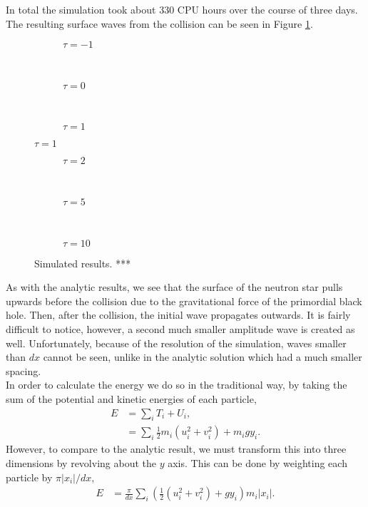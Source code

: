 In total the simulation took about 330 CPU hours over the course of three days. The resulting surface waves from the collision can be seen in Figure \ref{fig:simresults}.
\begin{figure}[p]
\centering
\begin{subfigure}{\textwidth}

\caption{$\tau = -1$}
\end{subfigure} \\
\begin{subfigure}{\textwidth}

\caption{$\tau = 0$}
\end{subfigure} \\
\begin{subfigure}{\textwidth}

\caption{$\tau = 1$}
\end{subfigure}
\end{figure}
\begin{figure}[p] \ContinuedFloat
\centering
\begin{subfigure}{\textwidth}

\caption{$\tau = 2$}
\end{subfigure} \\
\begin{subfigure}{\textwidth}

\caption{$\tau = 5$}
\end{subfigure} \\
\begin{subfigure}{\textwidth}

\caption{$\tau = 10$}
\end{subfigure}
\caption{Simulated results.  ***}
\label{fig:simresults}
\end{figure}
As with the analytic results, we see that the surface of the neutron star pulls upwards before the collision due to the gravitational force of the primordial black hole. Then, after the collision, the initial wave propagates outwards. It is fairly difficult to notice, however, a second much smaller amplitude wave is created as well. Unfortunately, because of the resolution of the simulation, waves smaller than $dx$ cannot be seen, unlike in the analytic solution which had a much smaller spacing. \\

In order to calculate the energy we do so in the traditional way, by taking the sum of the potential and kinetic energies of each particle,
\begin{align*}
E &= \sum_i T_i + U_i, \\
&= \sum_i \frac{1}{2} m_i \left( u_i^2 + v_i^2 \right) + m_i g y_i.
\end{align*}
However, to compare to the analytic result, we must transform this into three dimensions by revolving about the $y$ axis. This can be done by weighting each particle by $\pi |x_i| / dx$,
\begin{align*}
E &= \frac{\pi}{dx} \sum_i \left( \frac{1}{2} \left( u_i^2 + v_i^2 \right) + g y_i \right) m_i |x_i|.
\end{align*}


